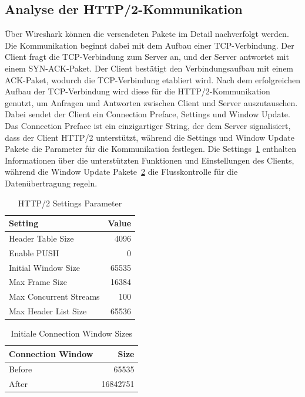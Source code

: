 \FloatBarrier
\subsection{Analyse der HTTP/2-Kommunikation}

Über Wireshark können die versendeten Pakete im Detail nachverfolgt werden. Die Kommunikation beginnt dabei mit dem Aufbau einer TCP-Verbindung.
Der Client fragt die TCP-Verbindung zum Server an, und der Server antwortet mit einem SYN-ACK-Paket.
Der Client bestätigt den Verbindungsaufbau mit einem ACK-Paket, wodurch die TCP-Verbindung etabliert wird.
Nach dem erfolgreichen Aufbau der TCP-Verbindung wird diese für die HTTP/2-Kommunikation genutzt, um Anfragen und Antworten zwischen Client und Server auszutauschen.
Dabei sendet der Client ein Connection Preface, Settings und Window Update.
Das Connection Preface ist ein einzigartiger String, der dem Server signalisiert, dass der Client HTTP/2 unterstützt, während die Settings und Window Update Pakete die Parameter für die Kommunikation festlegen.
Die Settings~\ref{tab:http2_settings} enthalten Informationen über die unterstützten Funktionen und Einstellungen des Clients, während die Window Update Pakete~\ref{tab:http2_window_sizes} die Flusskontrolle für die Datenübertragung regeln.

\begin{table}[h]
    \centering
    \begin{tabular}{|l|r|}
        \hline
        \textbf{Setting} & \textbf{Value} \\ \hline
        Header Table Size & 4096 \\ \hline
        Enable PUSH & 0 \\ \hline
        Initial Window Size & 65535 \\ \hline
        Max Frame Size & 16384 \\ \hline
        Max Concurrent Streams & 100 \\ \hline
        Max Header List Size & 65536 \\ \hline
    \end{tabular}
    \caption{HTTP/2 Settings Parameter}\label{tab:http2_settings}
\end{table}

\begin{table}[h]
    \centering
    \begin{tabular}{|l|r|}
        \hline
        \textbf{Connection Window} & \textbf{Size} \\ \hline
        Before & 65535 \\ \hline
        After & 16842751 \\ \hline
    \end{tabular}
    \caption{Initiale Connection Window Sizes}\label{tab:http2_window_sizes}
\end{table}

